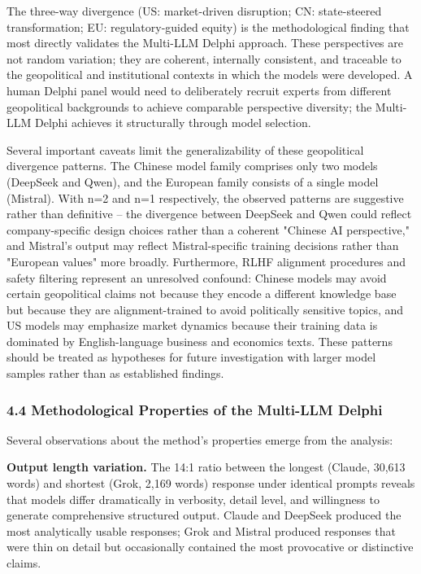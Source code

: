 \documentclass{article}
\begin{document}
The three-way divergence (US: market-driven disruption; CN: state-steered transformation; EU: regulatory-guided equity) is the methodological finding that most directly validates the Multi-LLM Delphi approach. These perspectives are not random variation; they are coherent, internally consistent, and traceable to the geopolitical and institutional contexts in which the models were developed. A human Delphi panel would need to deliberately recruit experts from different geopolitical backgrounds to achieve comparable perspective diversity; the Multi-LLM Delphi achieves it structurally through model selection.

Several important caveats limit the generalizability of these geopolitical divergence patterns. The Chinese model family comprises only two models (DeepSeek and Qwen), and the European family consists of a single model (Mistral). With n=2 and n=1 respectively, the observed patterns are suggestive rather than definitive -- the divergence between DeepSeek and Qwen could reflect company-specific design choices rather than a coherent "Chinese AI perspective," and Mistral's output may reflect Mistral-specific training decisions rather than "European values" more broadly. Furthermore, RLHF alignment procedures and safety filtering represent an unresolved confound: Chinese models may avoid certain geopolitical claims not because they encode a different knowledge base but because they are alignment-trained to avoid politically sensitive topics, and US models may emphasize market dynamics because their training data is dominated by English-language business and economics texts. These patterns should be treated as hypotheses for future investigation with larger model samples rather than as established findings.


\subsubsection{4.4 Methodological Properties of the Multi-LLM Delphi}
\label{sec:4_4_methodological_properties_of_the_multi_llm_delphi}

Several observations about the method's properties emerge from the analysis:

\textbf{Output length variation.} The 14:1 ratio between the longest (Claude, 30,613 words) and shortest (Grok, 2,169 words) response under identical prompts reveals that models differ dramatically in verbosity, detail level, and willingness to generate comprehensive structured output. Claude and DeepSeek produced the most analytically usable responses; Grok and Mistral produced responses that were thin on detail but occasionally contained the most provocative or distinctive claims.
\end{document}
